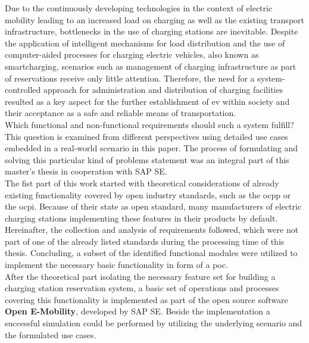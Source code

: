 

\Abstract
Due to the continuously developing technologies in the context of electric mobility leading to an increased load on charging as well as the existing transport infrastructure, bottlenecks in the use of charging stations are inevitable.
Despite the application of intelligent mechanisms for load distribution and the use of computer-aided processes for charging electric vehicles, also known as \gls{smartcharging}, scenarios such as  management of charging infrastructure as part of reservations receive only little attention. 
Therefore, the need for a system-controlled approach for administration and distribution of charging facilities resulted as a key aspect for the further establishment of \acrfull{ev} within society and their acceptance as a safe and reliable means of transportation.\\
Which functional and non-functional requirements should such a system fulfill? This question is examined from different perspectives using detailed use cases embedded in a real-world scenario in this paper. 
The process of formulating and solving this particular kind of problems statement was an integral part of this master's thesis in cooperation with SAP SE.\\
The fist part of this work started with theoretical considerations of already existing functionality covered by open industry standards, such as the \acrfull{ocpp} or the \acrfull{ocpi}. Because of their state as open standard, many manufacturers of electric charging stations implementing these features in their products by default. Hereinafter, the collection and analysis of requirements followed, which were not part of one of the already listed standards during the processing time of this thesis. Concluding, a subset of the identified functional modules were utilized to implement the necessary basic functionality in form of a \acrshort{poc}.\\
After the theoretical part isolating the necessary feature set for building a charging station reservation system, a basic set of operations and processes covering this functionality is implemented as part of the open source software \textbf{Open E-Mobility}, developed by SAP SE. Beside the implementation a successful simulation could be performed by utilizing the underlying scenario and the formulated use cases. 
